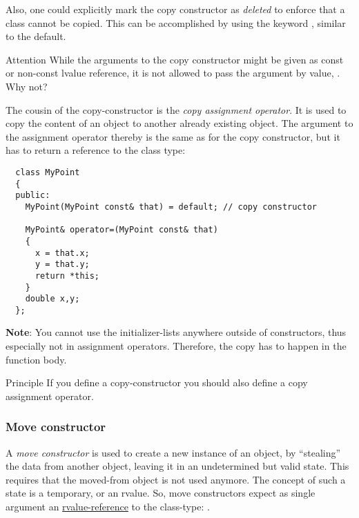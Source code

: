 Also, one could explicitly mark the copy constructor as \emph{deleted} to enforce that a class cannot be copied. This can be accomplished by using the
keyword , similar to the default.

\begin{guideline}{Attention}
  While the arguments to the copy constructor might be given as const or non-const lvalue reference, it is not allowed to pass the argument by value, \eg
  . Why not?
\end{guideline}

The cousin of the copy-constructor is the \emph{copy assignment operator}. It is used to copy the content of an object to another already existing object.
The argument to the assignment operator thereby is the same as for the copy constructor, but it has to return a reference to the class type:
%
\begin{verbatim}
  class MyPoint
  {
  public:
    MyPoint(MyPoint const& that) = default; // copy constructor

    MyPoint& operator=(MyPoint const& that)
    {
      x = that.x;
      y = that.y;
      return *this;
    }
    double x,y;
  };
\end{verbatim}

\textbf{Note}: You cannot use the initializer-lists anywhere outside of constructors, thus especially not in assignment operators. Therefore, the copy has to
happen in the function body.

\begin{guideline}{Principle}
  If you define a copy-constructor you should also define a copy assignment operator.
\end{guideline}


\subsubsection{Move constructor}
A \emph{move constructor}\marginpar{[\cxx{11}]} is used to create a new instance of an object, by ``stealing'' the data from another object,
leaving it in an undetermined but valid state. This requires that the moved-from object is not used anymore. The concept of such a state is a temporary, or
an rvalue. So, move constructors expect as single argument an \underline{rvalue-reference} to the class-type: .

